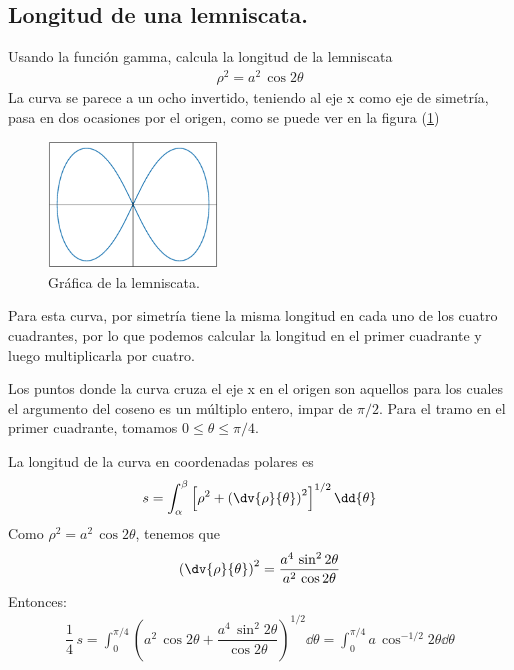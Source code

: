 \subsection*{Longitud de una lemniscata.}
Usando la función gamma, calcula la longitud de la lemniscata
\begin{align*}
\rho^{2} = a^{2} \, \cos 2 \theta
\end{align*}
La curva se parece a un ocho invertido, teniendo al eje x como eje de simetría, pasa en dos ocasiones por el origen, como se puede ver en la figura (\ref{fig:figura_01})
\begin{figure}
    \centering
    \includegraphics[width=0.4\textwidth]{Imagenes/plot_leminscata_01.eps}
    \caption{Gráfica de la lemniscata.}
    \label{fig:figura_01}
\end{figure}
Para esta curva, por simetría tiene la misma longitud en cada uno de los cuatro cuadrantes, por lo que podemos calcular la longitud en el primer cuadrante y luego multiplicarla por cuatro.
\par
Los puntos donde la curva cruza el eje x en el origen son aquellos para los cuales el argumento del coseno es un múltiplo entero, impar de $\pi / 2$. Para el tramo en el primer cuadrante, tomamos $0 \leq \theta \leq \pi/4$.
\par
La longitud de la curva en coordenadas polares es
\begin{align*}
s = \int_{\alpha}^{\beta} \left[ \rho^{2} + \left( \dv{\rho}{\theta} \right)^{2} \right]^{1/2} \dd{\theta}
\end{align*}
Como $\rho^{2} = a^{2} \, \cos 2 \theta$, tenemos que
\begin{align*}
\left( \dv{\rho}{\theta} \right)^{2} = \dfrac{a^{4} \, \sin^{2} 2 \theta}{a^{2} \, \cos 2 \theta}
\end{align*}
Entonces:
\begin{align*}
\dfrac{1}{4} \, s = \int_{0}^{\pi/4} \left( a^{2} \, \cos 2 \theta + \dfrac{a^{4} \, \sin^{2} 2 \theta}{\cos 2 \theta} \right)^{1/2} \dd{\theta} = \int_{0}^{\pi/4} a \, \cos^{-1/2} 2 \theta \dd{\theta}
\end{align*}
